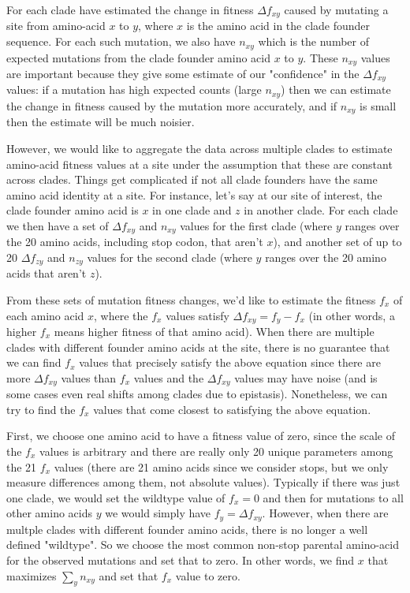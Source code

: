 \documentclass[9pt,twocolumn,twoside]{gsajnl_modified}
\begin{document}
{For each clade have estimated the change in fitness $\Delta f_{xy}$ caused by mutating a site from amino-acid $x$ to $y$, where $x$ is the amino acid in the clade founder sequence.
For each such mutation, we also have $n_{xy}$ which is the number of expected mutations from the clade founder amino acid $x$ to $y$.
These $n_{xy}$ values are important because they give some estimate of our "confidence" in the $\Delta f_{xy}$ values: if a mutation has high expected counts (large $n_{xy}$) then we can estimate the change in fitness caused by the mutation more accurately, and if $n_{xy}$ is small then the estimate will be much noisier.

However, we would like to aggregate the data across multiple clades to estimate amino-acid fitness values at a site under the assumption that these are constant across clades.
Things get complicated if not all clade founders have the same amino acid identity at a site.
For instance, let's say at our site of interest, the clade founder amino acid is $x$ in one clade and $z$ in another clade.
For each clade we then have a set of $\Delta f_{xy}$ and $n_{xy}$ values for the first clade (where $y$ ranges over the 20 amino acids, including stop codon, that aren't $x$), and another set of up to 20 $\Delta f_{zy}$ and $n_{zy}$ values for the second clade (where $y$ ranges over the 20 amino acids that aren't $z$).

From these sets of mutation fitness changes, we'd like to estimate the fitness $f_x$ of each amino acid $x$, where the $f_x$ values satisfy $\Delta f_{xy} = f_y - f_x$ (in other words, a higher $f_x$ means higher fitness of that amino acid).
When there are multiple clades with different founder amino acids at the site, there is no guarantee that we can find $f_x$ values that precisely satisfy the above equation since there are more $\Delta f_{xy}$ values than $f_x$ values and the $\Delta f_{xy}$ values may have noise (and is some cases even real shifts among clades due to epistasis).
Nonetheless, we can try to find the $f_x$ values that come closest to satisfying the above equation.

First, we choose one amino acid to have a fitness value of zero, since the scale of the $f_x$ values is arbitrary and there are really only 20 unique parameters among the 21 $f_x$ values (there are 21 amino acids since we consider stops, but we only measure differences among them, not absolute values).
Typically if there was just one clade, we would set the wildtype value of $f_x = 0$ and then for mutations to all other amino acids $y$ we would simply have $f_y = \Delta f_{xy}$.
However, when there are multple clades with different founder amino acids, there is no longer a well defined "wildtype".
So we choose the most common non-stop parental amino-acid for the observed mutations and set that to zero.
In other words, we find $x$ that maximizes $\sum_y n_{xy}$ and set that $f_x$ value to zero.

}
\end{document}

